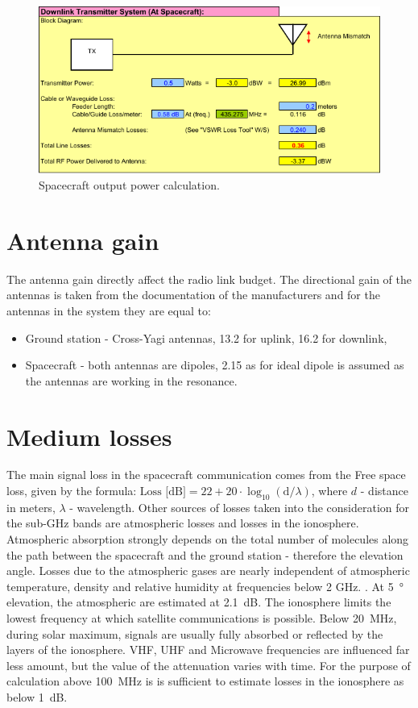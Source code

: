 \begin{figure}
    \centering
    \includegraphics[width=0.8\paperwidth]{img/6/tx_spacecraft.pdf}
    \caption{Spacecraft output power calculation.}
    \label{link:tx_spacecraft}
\end{figure}


\section{Antenna gain}
The antenna gain directly affect the radio link budget. The directional gain of the antennas is taken from the documentation of the manufacturers and for the antennas in the system they are equal to:
\begin{itemize}
    \item Ground station - Cross-Yagi antennas, \SI{13.2}{\dBi} for uplink, \SI{16.2}{\dBi} for downlink,
    \item Spacecraft - both antennas are dipoles, \SI{2.15}{\dBi} as for ideal dipole is assumed as the antennas are working in the resonance. 
\end{itemize}


\section{Medium losses}
The main signal loss in the spacecraft communication comes from the Free space loss, given by the formula: $\text{Loss [dB]} = 22 + 20 \cdot \log_{10} (\text{d}/\lambda)$, where $d$ - distance in meters, $\lambda$ - wavelength. Other sources of losses taken into the consideration for the sub-GHz bands are atmospheric losses and losses in the ionosphere. Atmospheric absorption strongly depends on the total number of molecules along the path between the spacecraft and the ground station - therefore the elevation angle. Losses due to the atmospheric gases are nearly independent of atmospheric temperature, density and relative humidity at frequencies below 2 GHz. \cite{sat_propagation}. At \SI{5}{\degree} elevation, the atmospheric are estimated at \SI{2.1}{\dB}. The ionosphere limits the lowest frequency at which satellite communications is possible. Below \SI{20}{\MHz}, during solar maximum, signals are usually fully absorbed or reflected by the layers of the ionosphere. VHF, UHF and Microwave frequencies are influenced far less amount, but the value of the attenuation varies with time. For the purpose of calculation above \SI{100}{\MHz} is is sufficient to estimate losses in the ionosphere as below \SI{1}{\dB}.

